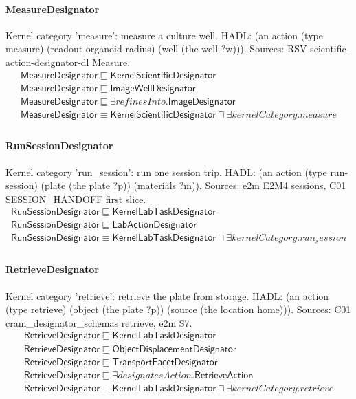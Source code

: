 \documentclass[10pt]{article}
\begin{document}
\paragraph{MeasureDesignator} Kernel category 'measure': measure a culture well. HADL: (an action (type measure) (readout organoid-radius) (well (the well ?w))). Sources: RSV scientific-action-designator-dl Measure.
\[\begin{array}{l}
\mathsf{MeasureDesignator} \sqsubseteq  \mathsf{KernelScientificDesignator} \\
\mathsf{MeasureDesignator} \sqsubseteq  \mathsf{ImageWellDesignator} \\
\mathsf{MeasureDesignator} \sqsubseteq  \exists \mathit{refinesInto}.\mathsf{ImageDesignator} \\
\mathsf{MeasureDesignator} \equiv  \mathsf{KernelScientificDesignator} \sqcap  \exists \mathit{kernelCategory}.{measure} \\
\end{array}\]
\paragraph{RunSessionDesignator} Kernel category 'run\_session': run one session trip. HADL: (an action (type run-session) (plate (the plate ?p)) (materials ?m)). Sources: e2m E2M4 sessions, C01 SESSION\_HANDOFF first slice.
\[\begin{array}{l}
\mathsf{RunSessionDesignator} \sqsubseteq  \mathsf{KernelLabTaskDesignator} \\
\mathsf{RunSessionDesignator} \sqsubseteq  \mathsf{LabActionDesignator} \\
\mathsf{RunSessionDesignator} \equiv  \mathsf{KernelLabTaskDesignator} \sqcap  \exists \mathit{kernelCategory}.{run_session} \\
\end{array}\]
\paragraph{RetrieveDesignator} Kernel category 'retrieve': retrieve the plate from storage. HADL: (an action (type retrieve) (object (the plate ?p)) (source (the location home))). Sources: C01 cram\_designator\_schemas retrieve, e2m S7.
\[\begin{array}{l}
\mathsf{RetrieveDesignator} \sqsubseteq  \mathsf{KernelLabTaskDesignator} \\
\mathsf{RetrieveDesignator} \sqsubseteq  \mathsf{ObjectDisplacementDesignator} \\
\mathsf{RetrieveDesignator} \sqsubseteq  \mathsf{TransportFacetDesignator} \\
\mathsf{RetrieveDesignator} \sqsubseteq  \exists \mathit{designatesAction}.\mathsf{RetrieveAction} \\
\mathsf{RetrieveDesignator} \equiv  \mathsf{KernelLabTaskDesignator} \sqcap  \exists \mathit{kernelCategory}.{retrieve} \\
\end{array}\]
\end{document}
